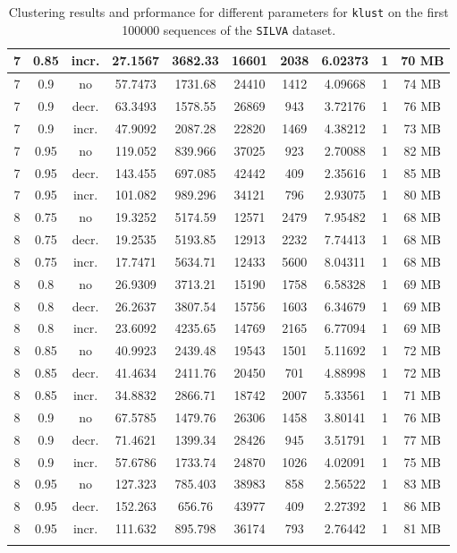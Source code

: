 \begin{longtable}{c|c|c|c|c|c|c|c|c|c}
  7  &  0.85  & incr. & 27.1567  &  3682.33 &  16601  &  2038  &  6.02373  &  1  & 70  MB \\
  \hline
  7  &  0.9   & no    & 57.7473  &  1731.68 &  24410  &  1412  &  4.09668  &  1  & 74  MB \\
  7  &  0.9   & decr. & 63.3493  &  1578.55 &  26869  &  943   &  3.72176  &  1  & 76  MB \\
  7  &  0.9   & incr. & 47.9092  &  2087.28 &  22820  &  1469  &  4.38212  &  1  & 73  MB \\
  \hline
  7  &  0.95  & no    & 119.052  &  839.966 &  37025  &  923   &  2.70088  &  1  & 82  MB \\
  7  &  0.95  & decr. & 143.455  &  697.085 &  42442  &  409   &  2.35616  &  1  & 85  MB \\
  7  &  0.95  & incr. & 101.082  &  989.296 &  34121  &  796   &  2.93075  &  1  & 80  MB \\
  \hline
  8  &  0.75  & no    & 19.3252  &  5174.59 &  12571  &  2479  &  7.95482  &  1  & 68  MB \\
  8  &  0.75  & decr. & 19.2535  &  5193.85 &  12913  &  2232  &  7.74413  &  1  & 68  MB \\
  8  &  0.75  & incr. & 17.7471  &  5634.71 &  12433  &  5600  &  8.04311  &  1  & 68  MB \\
  \hline
  8  &  0.8   & no    & 26.9309  &  3713.21 &  15190  &  1758  &  6.58328  &  1  & 69  MB \\
  8  &  0.8   & decr. & 26.2637  &  3807.54 &  15756  &  1603  &  6.34679  &  1  & 69  MB \\
  8  &  0.8   & incr. & 23.6092  &  4235.65 &  14769  &  2165  &  6.77094  &  1  & 69  MB \\
  \hline
  8  &  0.85  & no    & 40.9923  &  2439.48 &  19543  &  1501  &  5.11692  &  1  & 72  MB \\
  8  &  0.85  & decr. & 41.4634  &  2411.76 &  20450  &  701   &  4.88998  &  1  & 72  MB \\
  8  &  0.85  & incr. & 34.8832  &  2866.71 &  18742  &  2007  &  5.33561  &  1  & 71  MB \\
  \hline
  8  &  0.9   & no    & 67.5785  &  1479.76 &  26306  &  1458  &  3.80141  &  1  & 76  MB \\
  8  &  0.9   & decr. & 71.4621  &  1399.34 &  28426  &  945   &  3.51791  &  1  & 77  MB \\
  8  &  0.9   & incr. & 57.6786  &  1733.74 &  24870  &  1026  &  4.02091  &  1  & 75  MB \\
  \hline
  8  &  0.95  & no    & 127.323  &  785.403 &  38983  &  858   &  2.56522  &  1  & 83  MB \\
  8  &  0.95  & decr. & 152.263  &  656.76  &  43977  &  409   &  2.27392  &  1  & 86  MB \\
  8  &  0.95  & incr. & 111.632  &  895.798 &  36174  &  793   &  2.76442  &  1  & 81  MB \\
  \caption{Clustering results and prformance for different parameters for
    \texttt{klust} on the first \num{100000} sequences of the \texttt{SILVA}
    dataset.}
  \label{fig:klust_results_params}
\end{longtable}
\endgroup


